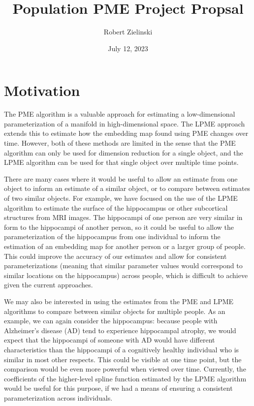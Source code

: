 \documentclass[11pt, reqno]{article}
\title{Population PME Project Propsal}
\author{Robert Zielinski}
\date{July 12, 2023}
\begin{document}
\maketitle

\section{Motivation}

The PME algorithm is a valuable approach for estimating a low-dimensional parameterization of a manifold in high-dimensional space. The LPME approach extends this to estimate how the embedding map found using PME changes over time. However, both of these methods are limited in the sense that the PME algorithm can only be used for dimension reduction for a single object, and the LPME algorithm can be used for that single object over multiple time points.

There are many cases where it would be useful to allow an estimate from one object to inform an estimate of a similar object, or to compare between estimates of two similar objects. For example, we have focused on the use of the LPME algorithm to estimate the surface of the hippocampus or other subcortical structures from MRI images. The hippocampi of one person are very similar in form to the hippocampi of another person, so it could be useful to allow the parameterization of the hippocampus from one individual to inform the estimation of an embedding map for another person or a larger group of people. This could improve the accuracy of our estimates and allow for consistent parameterizations (meaning that similar parameter values would correspond to similar locations on the hippocampus) across people, which is difficult to achieve given the current approaches.

We may also be interested in using the estimates from the PME and LPME algorithms to compare between similar objects for multiple people. As an example, we can again consider the hippocampus: because people with Alzheimer's disease (AD) tend to experience hippocampal atrophy, we would expect that the hippocampi of someone with AD would have different characteristics than the hippocampi of a cognitively healthy individual who is similar in most other respects. This could be visible at one time point, but the comparison would be even more powerful when viewed over time. Currently, the coefficients of the higher-level spline function estimated by the LPME algorithm would be useful for this purpose, if we had a means of ensuring a consistent parameterization across individuals. 
\end{document}
